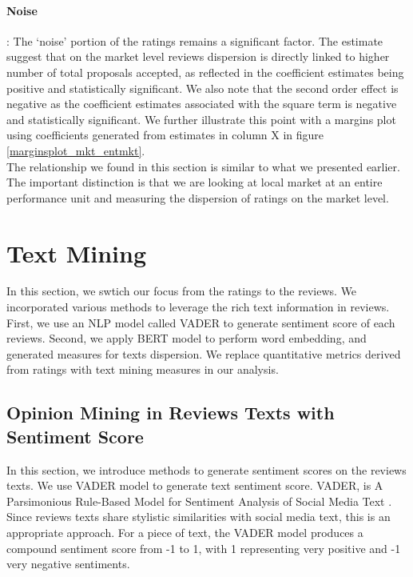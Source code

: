 \documentclass[msom,blindrev]{informs3}
\begin{document}
\paragraph{Noise}: The `noise' portion of the ratings remains a significant factor. The estimate suggest that on the market level reviews dispersion is directly linked to higher number of total proposals accepted, as reflected in the coefficient estimates being positive and statistically significant. We also note that the second order effect is negative as the coefficient estimates associated with the square term is negative and statistically significant. We further illustrate this point with a margins plot using coefficients generated from estimates in column X in figure \ref{marginsplot_mkt_entmkt}. \\
The relationship we found in this section is similar to what we presented earlier. The important distinction is that we are looking at local market at an entire performance unit and measuring the dispersion of ratings on the market level.
\section{Text Mining}




In this section, we swtich our focus from the ratings to the reviews. We incorporated various methods to leverage the rich text information in reviews.  First, we use an NLP model called VADER to generate sentiment score of each reviews. Second, we apply BERT model to perform word embedding, and generated measures for texts dispersion. We replace quantitative metrics derived from ratings with text mining measures in our analysis. 

\subsection{Opinion Mining in Reviews Texts with Sentiment Score}
In this section, we introduce methods to generate sentiment scores on the reviews texts. We use VADER model to generate text sentiment score. VADER, is A Parsimonious Rule-Based Model for Sentiment Analysis of Social Media Text \citep{hutto2014vader}. Since reviews texts share stylistic similarities with social media text, this is an appropriate approach. For a piece of text, the VADER model produces a compound sentiment score from -1 to 1, with 1 representing very positive and -1  very negative sentiments. 
\end{document}
